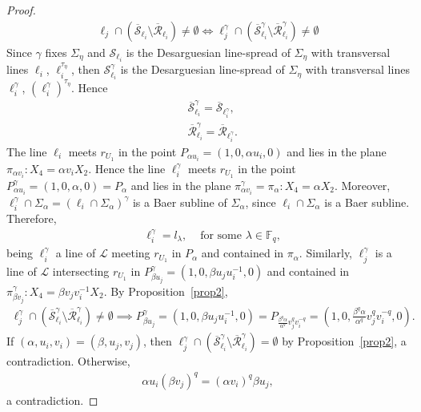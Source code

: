 \documentclass[11pt]{article}
\theoremstyle{definition}
\numberwithin{equation}{section}
\def\cL{\mathcal L}
\def\cU{\mathcal U}
\def\cR{\mathcal R}
\def\cS{\mathcal S}
\def\F{{\mathbb F}}
\begin{document}
\begin{proof}
\begin{align*}
\ell_j \cap \left( \overline{\cS}_{\ell_i} \setminus \overline{\cR}_{\ell_i} \right) \ne \emptyset \iff \ell_j^\gamma \cap \left( \overline{\cS}_{\ell_i}^\gamma \setminus \overline{\cR}_{\ell_i}^\gamma \right) \ne \emptyset
\end{align*}
Since $\gamma$ fixes $\Sigma_{\eta}$ and $\cS_{\ell_{i}}$ is the Desarguesian line-spread of $\Sigma_{\eta}$ with transversal lines $\ell_{i}$, $\ell_i^{\tau_{\eta}}$, then $\cS_{\ell_i}^\gamma$ is the Desarguesian line-spread of $\Sigma_{\eta}$ with transversal lines $\ell_i^\gamma$, $\left(\ell_i^\gamma\right)^{\tau_{\eta}}$. Hence 
\begin{align*}
& \overline{\cS}_{\ell_i}^\gamma = \overline{\cS}_{\ell_i^\gamma}, \\
& \overline{\cR}_{\ell_i}^\gamma = \overline{\cR}_{\ell_i^\gamma}.
\end{align*}
The line $\ell_i$ meets $r_{U_1}$ in the point $P_{\alpha u_i} = (1,0,\alpha u_i,0)$ and lies in the plane $\pi_{\alpha v_i}: X_4 = \alpha v_i X_2$. Hence the line $\ell_i^\gamma$ meets $r_{U_1}$ in the point $P_{\alpha u_i}^\gamma = (1, 0, \alpha, 0) = P_{\alpha}$ and lies in the plane $\pi_{\alpha v_i}^\gamma = \pi_{\alpha}: X_4 = \alpha X_2$. Moreover, $\ell_i^\gamma \cap \Sigma_{\alpha} = \left(\ell_i \cap \Sigma_{\alpha}\right)^\gamma$ is a Baer subline of $\Sigma_{\alpha}$, since $\ell_i \cap \Sigma_{\alpha}$ is a Baer subline. Therefore, 
\begin{align*}
& \ell_i^\gamma = l_\lambda, & \mbox{ for some } \lambda \in \F_q, 
\end{align*}
being $\ell_i^\gamma$ a line of $\cL$ meeting $r_{U_1}$ in $P_{\alpha}$ and contained in $\pi_{\alpha}$. Similarly, $\ell_j^\gamma$ is a line of $\cL$ intersecting $r_{U_1}$ in $P_{\beta u_j}^\gamma = (1,0,\beta u_j u_i^{-1}, 0)$ and contained in $\pi_{\beta v_j}^\gamma: X_4 = \beta v_j v_i^{-1} X_2$. By Proposition~\ref{prop2}, 
\begin{align*}
\ell_j^\gamma \cap \left( \overline{\cS}_{\ell_{i}}^\gamma \setminus \overline{\cR}_{\ell_{i}}^\gamma \right) \ne \emptyset \implies P_{\beta u_j}^\gamma = \left(1,0,\beta u_j u_i^{-1}, 0\right) = P_{\frac{\beta^q \alpha}{\alpha^q} v_j^q v_i^{-q}} = \left(1,0,\frac{\beta^q \alpha}{\alpha^q} v_j^q v_i^{-q}, 0\right).
\end{align*}   
If $(\alpha, u_i, v_i) = (\beta, u_j, v_j)$, then $\ell_j^\gamma \cap \left( \overline{\cS}_{\ell_i}^\gamma \setminus \overline{\cR}_{\ell_i}^\gamma \right) = \emptyset$ by Proposition~\ref{prop2}, a contradiction.
Otherwise, 
\begin{align*}
\alpha u_i \left(\beta v_j\right)^q = \left(\alpha v_i\right)^q \beta u_j, 
\end{align*}
a contradiction.
\end{proof}
\end{document}
